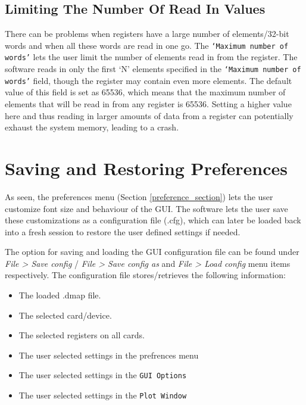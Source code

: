 \subsection{Limiting The Number Of Read In Values}\label{subsub::graph_x_axis}
There can be problems when registers have a large number of elements/32-bit
words and when all these words are read in one go. The \texttt{`Maximum number
of words'} lets the user limit the number of elements read in from the register.
The software reads in only the first `N' elements specified in the
\texttt{`Maximum number of words'} field, though the register may contain even
more elements. The default value of this field is set as 65536, which means that
the maximum number of elements that will be read in from any register is 65536.
Setting a higher value here and thus reading in larger amounts of data from a
register can potentially exhaust the system memory, leading to a crash.
		
\section{Saving and Restoring Preferences} 
As seen, the preferences menu (Section \ref{preference_section}) 
lets the user customize font size and behaviour of the GUI. The software 
lets the user save these customizations as a
configuration file (.cfg), which can later be loaded back into a fresh session
to restore the user defined settings if needed.

The option for saving and loading the GUI configuration file can be found under
\textit{File > Save config} / \textit{File > Save config as} and \textit{File >
Load config }menu items respectively. The configuration file stores/retrieves
the following information:

\begin{itemize} 
	\item The loaded .dmap file. 
	\item The selected card/device.
    \item The selected registers on all cards. 
    \item The user selected
    settings in the prefrences menu 
    \item The user selected settings in the \texttt{GUI Options} 
    \item The user selected settings in the \texttt{Plot Window} 
\end{itemize}



%
%

